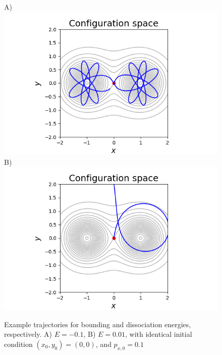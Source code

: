\documentclass[10pt,aps,onecolumn,superscriptaddress]{revtex4-2}
\begin{document}
\begin{figure}
    \centering
    A)\includegraphics{traj_type2.png}
    B)\includegraphics{traj_escapping.png}
    \caption{Example trajectories for bounding and dissociation energies, respectively. A) $E = -0.1$, B) $E=0.01$, with identical initial condition $(x_0, y_0) = (0, 0)$, and $p_{x,0} = 0.1$}
    \label{fig:my_label}
\end{figure}

\end{document}
